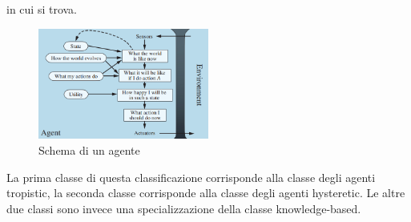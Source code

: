 \begin{itemize}
          in cui si trova.
          \begin{figure}
              \centering
              \includegraphics[width=0.5\textwidth]{./1_anno/SCMS/img/Agenti/UtilityBasedAgent.png}
              \caption{Schema di un agente}
              \label{fig:UtilityBased}
          \end{figure}
\end{itemize}

La prima classe di questa classificazione corrisponde alla classe degli agenti
tropistic, la seconda classe corrisponde alla classe degli agenti hysteretic. Le
altre due classi sono invece una specializzazione della classe knowledge-based.